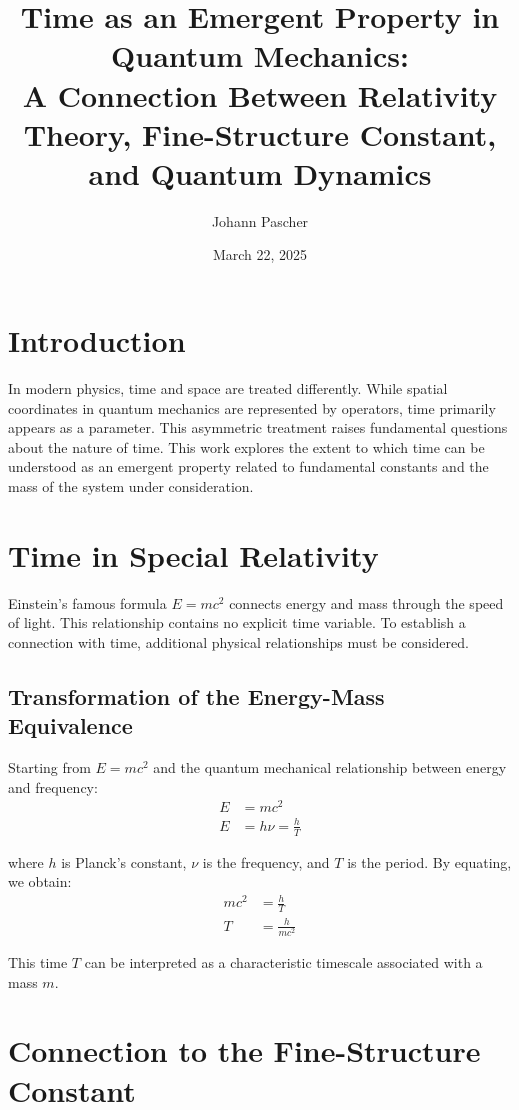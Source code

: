 \documentclass{article}
\title{Time as an Emergent Property in Quantum Mechanics: \\A Connection Between Relativity Theory, Fine-Structure Constant, and Quantum Dynamics}
\author{Johann Pascher}
\date{March 22, 2025}
\begin{document}
	
	\maketitle
	
	\section{Introduction}
	
	In modern physics, time and space are treated differently. While spatial coordinates in quantum mechanics are represented by operators, time primarily appears as a parameter. This asymmetric treatment raises fundamental questions about the nature of time. This work explores the extent to which time can be understood as an emergent property related to fundamental constants and the mass of the system under consideration.
	
	\tableofcontents
	\section{Time in Special Relativity}
	
	Einstein's famous formula $E = mc^2$ connects energy and mass through the speed of light. This relationship contains no explicit time variable. To establish a connection with time, additional physical relationships must be considered.
	
	\subsection{Transformation of the Energy-Mass Equivalence}
	
	Starting from $E = mc^2$ and the quantum mechanical relationship between energy and frequency:
	\begin{align}
		E &= mc^2 \\
		E &= h\nu = \frac{h}{T}
	\end{align}
	
	where $h$ is Planck's constant, $\nu$ is the frequency, and $T$ is the period. By equating, we obtain:
	\begin{align}
		mc^2 &= \frac{h}{T} \\
		T &= \frac{h}{mc^2}
	\end{align}
	
	This time $T$ can be interpreted as a characteristic timescale associated with a mass $m$.
	
	\section{Connection to the Fine-Structure Constant}
	
\end{document}
